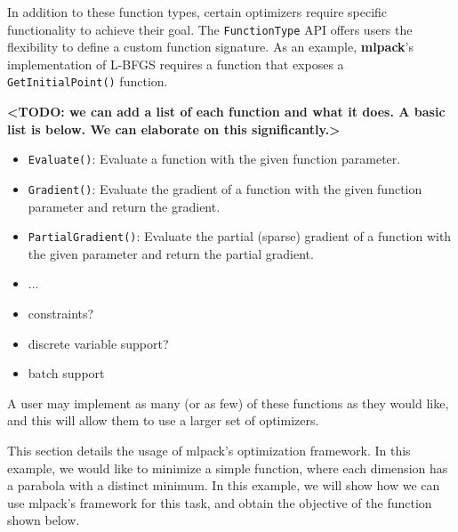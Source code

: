 \documentclass{article}
\begin{document}
In addition to these function types, certain optimizers require specific
functionality to achieve their goal. The {\tt FunctionType} API offers users the
flexibility to define a custom function signature. As an example, {\bf mlpack}'s
implementation of L-BFGS requires a function that exposes a
{\tt GetInitialPoint()} function.


{\bf <TODO: we can add a list of each function and what it does.  A basic list
is below.  We can elaborate on this significantly.>}

\begin{itemize}
  \item {\tt Evaluate()}: Evaluate a function with the given function parameter.

  \item {\tt Gradient()}: Evaluate the gradient of a function with the given
      function parameter and return the gradient.

  \item {\tt PartialGradient()}: Evaluate the partial (sparse) gradient of a
      function with the given parameter and return the partial gradient.

  \item ...
  \item constraints?
  \item discrete variable support?
  \item batch support
\end{itemize}

A user may implement as many (or as few) of these functions as they would like,
and this will allow them to use a larger set of optimizers.

This section details the usage of mlpack's optimization framework. In this
example, we would like to minimize a simple function, where each dimension has a
parabola with a distinct minimum. In this example, we will show how we can use
mlpack’s framework for this task, and obtain the objective of the function shown
below.
\end{document}
